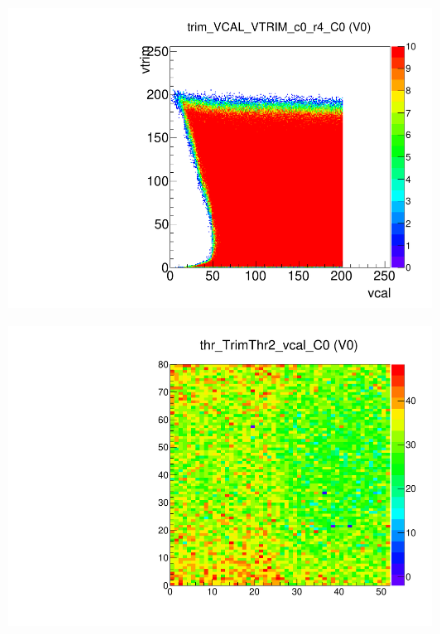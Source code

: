 
\begin{figure}[!Hp]
\centering
\begin{minipage}{0.45\textwidth}
  \includegraphics[width=1.0\textwidth]{figures/trim_trim_VCAL_VTRIM.pdf}
  \caption{}
  \label{fig:trim_trim_VCAL_VTRIM}
\end{minipage}
\end{figure}


\begin{figure}[!Hp]
\centering
\begin{minipage}{0.45\textwidth}
  \includegraphics[width=1.0\textwidth]{figures/trim_thr_TrimThr2_vcal.pdf}
  \caption{}
  \label{fig:trim_thr_TrimThr2_vcal}
\end{minipage}
\end{figure}


